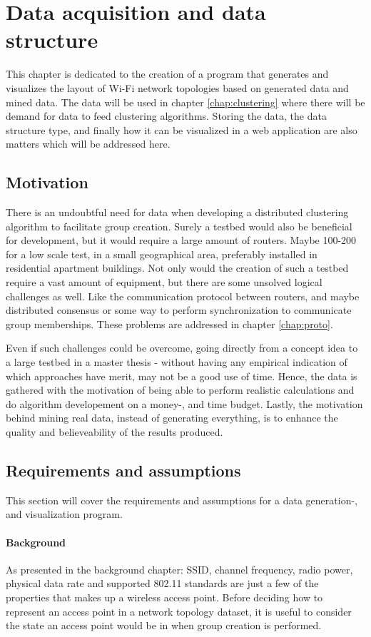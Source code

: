 \chapter{Data acquisition and data structure}\label{dataacc}
This chapter is dedicated to the creation of a program that generates and visualizes the layout of Wi-Fi network topologies based on generated data and mined data.
The data will be used in chapter \ref{chap:clustering} where there will be demand for data to feed clustering algorithms. Storing the data,
the data structure type, and finally how it can be visualized in a web application are also matters which will be addressed here. 

\section{Motivation}
There is an undoubtful need for data when developing a distributed clustering algorithm to facilitate group creation.
Surely a testbed would also be beneficial for development, but it would require a large amount of routers. Maybe 100-200 for a low scale test, in a small geographical area,
preferably installed in residential apartment buildings. Not only would the creation of such a testbed require a vast amount of equipment, but there are 
some unsolved logical challenges as well. Like the communication protocol between routers, and maybe distributed consensus or some way to perform synchronization to communicate group memberships.
These problems are addressed in chapter \ref{chap:proto}.

Even if such challenges could be overcome, going directly from a concept idea to a large testbed in a master thesis  - without having any empirical indication of which approaches have merit, may not be a good use of time. Hence, the data is gathered with the motivation of being able to perform realistic calculations and do algorithm developement on a money-, and time budget. Lastly, the motivation behind mining real data, instead of generating everything, is to enhance the quality and believeability of the results produced. 

\section{Requirements and assumptions}
This section will cover the requirements and assumptions for a data generation-, and visualization program. 

\subsubsection{Background}
As presented in the background chapter: SSID, channel frequency, radio power, physical data rate and supported 802.11 standards are just a few of the properties
that makes up a wireless access point. Before deciding how to represent an access point in a network topology dataset, it is useful to
consider the state an access point would be in when group creation is performed.  

